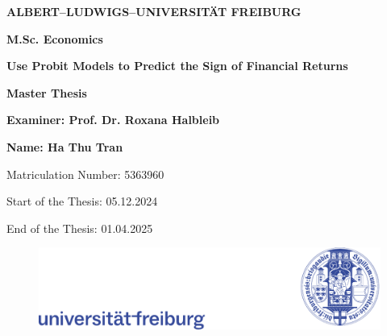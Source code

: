 

\begin{titlepage}
\begin{center}
\vspace{1cm}

\textbf{\Large ALBERT–LUDWIGS–UNIVERSITÄT FREIBURG}

\vspace{0.5cm}
\textbf{\Large M.Sc. Economics}

\vspace{2cm}
\textbf{\Large Use Probit Models to Predict the Sign of Financial Returns }

\vspace{1.5cm}
\textbf{Master Thesis}

\vspace{0.5cm}
\textbf{Examiner: Prof. Dr. Roxana Halbleib}

\vspace{0.5cm}
\textbf{Name: Ha Thu Tran}

\vspace{0.5cm}
Matriculation Number: 5363960

\vspace{0.5cm}
Start of the Thesis: 05.12.2024

\vspace{0.5cm}
End of the Thesis: 01.04.2025

\vspace{2cm}
\end{center}
 \vfill 
    \begin{figure}[b]
        \centering
        \includegraphics[width=\linewidth]{figures/title page/logo.pdf}
    \end{figure}
\end{titlepage}


\restoregeometry